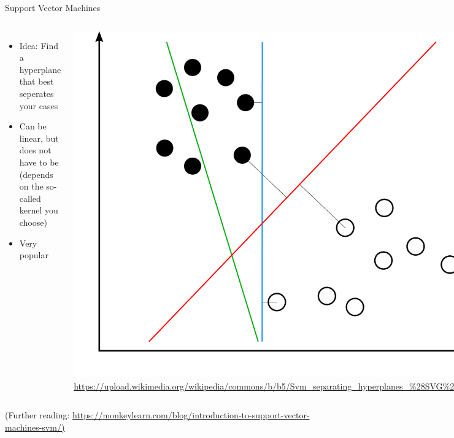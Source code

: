 \documentclass{beamer}
\begin{document}
\begin{frame}{Support Vector Machines}

\begin{columns}
\begin{itemize}
\item	Idea: Find a hyperplane that best seperates your cases
\item Can be linear, but does not have to be (depends on the so-called kernel you choose)
\item Very popular 
\end{itemize}

\includegraphics[width=.8\linewidth,height=.5\paperheight,keepaspectratio]{../pictures/svm}
\tiny{\url{https://upload.wikimedia.org/wikipedia/commons/b/b5/Svm\_separating\_hyperplanes\_\%28SVG\%29.svg}}

\end{columns}
\vfill
\footnotesize{(Further reading: \url{https://monkeylearn.com/blog/introduction-to-support-vector-machines-svm/)}}
\end{frame}
\end{document}
